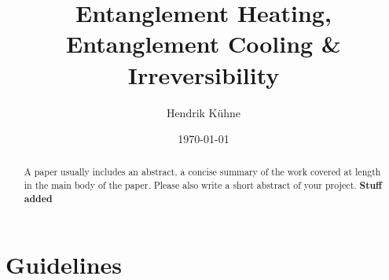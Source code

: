 \documentclass[reprint,amsmath,amssymb,aps,prb]{revtex4-2}
\begin{document}
    \title{Entanglement Heating, Entanglement Cooling \& Irreversibility}
    \author{Hendrik Kühne}
    \date{\today}

    \begin{abstract}
        A paper usually includes an abstract, a concise summary of the work covered at length in the main body of the paper. Please also write a short abstract of your project.
        \textbf{Stuff added}
    \end{abstract}

    \maketitle

    \section{Guidelines}

    \cite{Shaffer:IrreversibilityAndEntanglement:2014,Jizba:MultifractalThermodynamics:2004,Chamon:EmergentIrreversibility:2014,Odavic:RandomUnitaries:2023}

    

    \appendix
\end{document}
